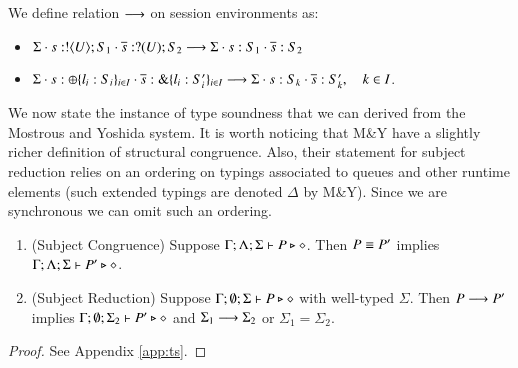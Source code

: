 \begin{definition}\rm
	We define relation $\longrightarrow$ on session environments as:
	\begin{itemize}
		\item	$\Sigma \cdot s: ! \langle U \rangle ; S_1 \cdot \overline{s}: ? (U) ; S_2 \longrightarrow \Sigma \cdot s: S_1 \cdot \overline{s}: S_2$
		\item	$\Sigma \cdot s: \oplus \{l_i: S_i\}_{i \in I} \cdot \overline{s}: \& \{l_i: S_i'\}_{i \in I} \longrightarrow \Sigma \cdot s: S_k \cdot \overline{s}: S_k', \quad k \in I$.
	\end{itemize}
\end{definition}

We now state the instance of type soundness that we can derived from the Mostrous and Yoshida system.
It is worth noticing that M\&Y have a slightly richer definition of structural congruence.
Also, their statement for subject reduction relies on an ordering on typings associated to queues and other 
runtime elements (such extended typings are denoted $\Delta$ by M\&Y).
Since we are synchronous we can omit such an ordering.

\begin{theorem}\label{t:sr}\rm
	\begin{enumerate}[1.]
		\item	(Subject Congruence) Suppose $\Gamma; \Lambda; \Sigma \vdash P \triangleright \diamond$.
			Then $P \equiv P'$ implies $\Gamma; \Lambda; \Sigma \vdash P' \triangleright \diamond$.

		\item	(Subject Reduction) Suppose $\Gamma; \emptyset; \Sigma \vdash P \triangleright \diamond$
			with
			well-typed $\Sigma$.
			Then $P \longrightarrow P'$ implies $\Gamma; \emptyset; \Sigma_2  \vdash P' \triangleright \diamond$
			and $\Sigma_1 \longrightarrow \Sigma_2$ or $\Sigma_1 = \Sigma_2$.
	\end{enumerate}
\end{theorem}

\begin{proof}
See Appendix \ref{app:ts}.
\end{proof}
